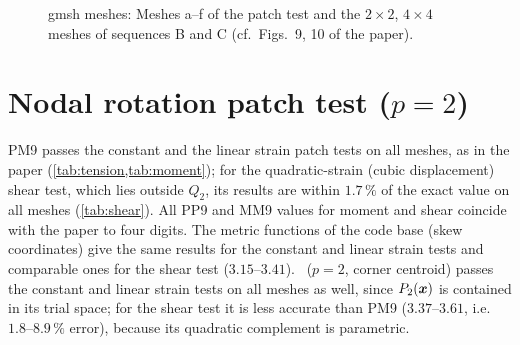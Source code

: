 \documentclass[10pt,a4paper]{article}
\begin{document}
\begin{figure}[t]
  \centering
  
  \caption{gmsh meshes: Meshes a--f of the patch test and the $2\times2$, $4\times4$ meshes of
    sequences B and C (cf.\ Figs.~9, 10 of the paper).}
  \label{fig:meshes}
\end{figure}

\section{Nodal rotation patch test ($p=2$)}\label{sec:patch}
\begin{table}[h]
  \centering\small
  \caption{Moment loading, $u_y(A)$ (paper: Table~15; exact $1.5$).}
  \label{tab:moment}
  \resizebox{\linewidth}{!}{}

  \vspace{3mm}
  \caption{Shear loading, $u_y(A)$ (paper: Table~16; exact $3.3125$). $^\ast$: differs from the
    present result, see \cref{sec:paper}.}
  \label{tab:shear}
  \resizebox{\linewidth}{!}{}

  \vspace{3mm}
  \caption{Tension, $u_x(A)$ (paper: Table~14; exact $1.0$). In
    \cref{tab:moment,tab:shear,tab:tension,tab:conv}, ``err.'' marks cases in which the code base
    stops because interior and edge nodes coincide (\cref{sec:code}).}
  \label{tab:tension}
  \resizebox{\linewidth}{!}{}
\end{table}
PM9 passes the constant and the linear strain patch tests on all meshes, as in the paper
(\cref{tab:tension,tab:moment}); for the quadratic-strain (cubic displacement) shear test, which
lies outside $Q_2$, its results are within $1.7\,\%$ of the exact value on all meshes
(\cref{tab:shear}). All PP9 and MM9 values for moment and shear coincide with the paper to four
digits. The metric functions of the code base (skew coordinates) give the same results for the
constant and linear strain tests and comparable ones for the shear test ($3.15$--$3.41$). \PH\
($p=2$, corner centroid) passes the constant and linear strain tests on all meshes as well, since
$P_2(\bm{x})$ is contained in its trial space; for the shear test it is less accurate than PM9
($3.37$--$3.61$, i.e.\ $1.8$--$8.9\,\%$ error), because its quadratic complement is parametric.
\end{document}

